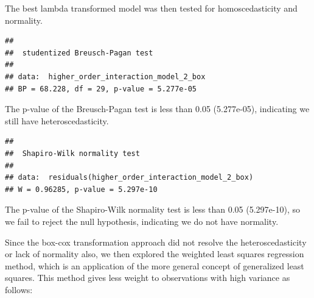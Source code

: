 \documentclass[
]{article}
\begin{document}
The best lambda transformed model was then tested for homoscedasticity
and normality.

\begin{verbatim}
## 
##  studentized Breusch-Pagan test
## 
## data:  higher_order_interaction_model_2_box
## BP = 68.228, df = 29, p-value = 5.277e-05
\end{verbatim}

The p-value of the Breusch-Pagan test is less than 0.05 (5.277e-05),
indicating we still have heteroscedasticity.

\begin{verbatim}
## 
##  Shapiro-Wilk normality test
## 
## data:  residuals(higher_order_interaction_model_2_box)
## W = 0.96285, p-value = 5.297e-10
\end{verbatim}

The p-value of the Shapiro-Wilk normality test is less than 0.05
(5.297e-10), so we fail to reject the null hypothesis, indicating we do
not have normality.

Since the box-cox transformation approach did not resolve the
heteroscedasticity or lack of normality also, we then explored the
weighted least squares regression method, which is an application of the
more general concept of generalized least squares. This method gives
less weight to observations with high variance as follows:
\end{document}
